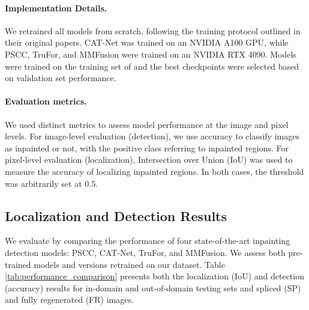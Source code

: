 \paragraph{Implementation Details.} We retrained all models from scratch, following the training protocol outlined in their original papers. CAT-Net was trained on an NVIDIA A100 GPU, while PSCC, TruFor, and MMFusion were trained on an NVIDIA RTX 4090. Models were trained on the training set of \emph{\datasetname} and the best checkpoints were selected based on validation set performance. 
\vspace{-14pt} 
\paragraph{Evaluation metrics.} We used distinct metrics to assess model performance at the image and pixel levels. For image-level evaluation (detection), we use accuracy to classify images as inpainted or not, with the positive class referring to inpainted regions. For pixel-level evaluation (localization), Intersection over Union (IoU) was used to measure the accuracy of localizing inpainted regions. In both cases, the threshold was arbitrarily set at $0.5$.


\subsection{Localization and Detection Results}

We evaluate \emph{\datasetname} by comparing the performance of four state-of-the-art inpainting detection models: PSCC, CAT-Net, TruFor, and MMFusion. We assess both pre-trained models and versions retrained on our dataset. Table \ref{tab:performance_comparison} presents both the localization (IoU) and detection (accuracy) results for in-domain and out-of-domain testing sets and spliced (SP) and fully regenerated (FR) images. 

